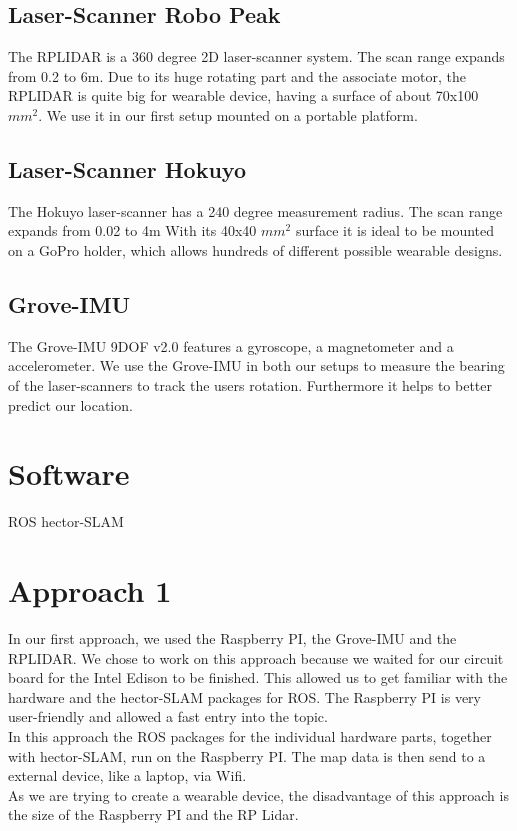 \documentclass{sigchi-ext}
\begin{document}
\subsection{Laser-Scanner Robo Peak}
The RPLIDAR is a 360 degree 2D laser-scanner system. The scan range expands from 0.2 to 6m. Due to its huge rotating part and the associate motor, the RPLIDAR is quite big for wearable device, having a surface of about 70x100 $mm^2$. We use it in our first setup mounted on a portable platform.
\subsection{Laser-Scanner Hokuyo}
The Hokuyo laser-scanner has a 240 degree measurement radius. The scan range expands from 0.02 to 4m With its 40x40 $mm^2$ surface it is ideal to be mounted on a GoPro holder, which allows hundreds of different possible wearable designs.
\subsection{Grove-IMU}
The Grove-IMU 9DOF v2.0 features a gyroscope, a magnetometer and a accelerometer. We use the Grove-IMU in both our setups to measure the bearing of the laser-scanners to track the users rotation. Furthermore it helps to better predict our location.
\section{Software}
ROS hector-SLAM
\section{Approach 1}
In our first approach, we used the Raspberry PI, the Grove-IMU and the RPLIDAR. We chose to work on this approach because we waited for our circuit board for the Intel Edison to be finished. This allowed us to get familiar with the hardware and the hector-SLAM packages for ROS. The Raspberry PI is very user-friendly and allowed a fast entry into the topic.\\
In this approach the ROS packages for the individual hardware parts, together with hector-SLAM, run on the Raspberry PI. The map data is then send to a external device, like a laptop, via Wifi.\\ 
As we are trying to create a wearable device, the disadvantage of this approach is the size of the Raspberry PI and the RP Lidar.
\end{document}
